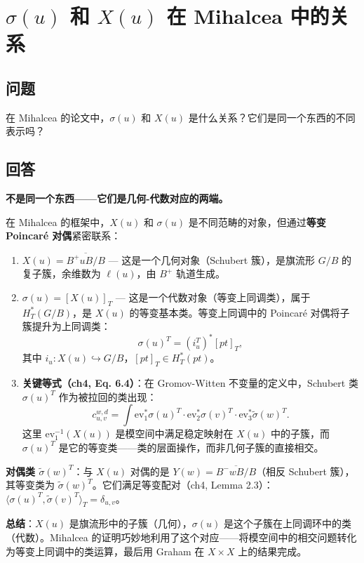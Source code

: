 \section{$\sigma(u)$ 和 $X(u)$ 在 Mihalcea 中的关系}
\subsection{问题}
在 Mihalcea 的论文中，$\sigma(u)$ 和 $X(u)$ 是什么关系？它们是同一个东西的不同表示吗？
\subsection{回答}
\textbf{不是同一个东西——它们是几何-代数对应的两端。}

在 Mihalcea 的框架中，$X(u)$ 和 $\sigma(u)$ 是不同范畴的对象，但通过\textbf{等变 Poincaré 对偶}紧密联系：

\begin{enumerate}
\item \textbf{$X(u) = \overline{B^+ u B / B}$} — 这是一个几何对象（Schubert 簇），是旗流形 $G/B$ 的复子簇，余维数为 $\ell(u)$，由 $B^+$ 轨道生成。

\item \textbf{$\sigma(u) = [X(u)]_T$} — 这是一个代数对象（等变上同调类），属于 $H_T^*(G/B)$，是 $X(u)$ 的等变基本类。等变上同调中的 Poincaré 对偶将子簇提升为上同调类：
$$\sigma(u)^T = (i_u^T)^*[pt]_T,$$
其中 $i_u: X(u) \hookrightarrow G/B$，$[pt]_T \in H_T^*(pt)$。

\item \textbf{关键等式（ch4, Eq. 6.4）}：在 Gromov-Witten 不变量的定义中，Schubert 类 $\sigma(u)^T$ 作为被拉回的类出现：
$$c_{u,v}^{w,d} = \int \mathrm{ev}_1^* \sigma(u)^T \cdot \mathrm{ev}_2^* \sigma(v)^T \cdot \mathrm{ev}_3^* \widetilde{\sigma}(w)^T.$$
这里 $\mathrm{ev}_1^{-1}(X(u))$ 是模空间中满足稳定映射在 $X(u)$ 中的子簇，而 $\sigma(u)^T$ 是它的等变类——类的层面操作，而非几何子簇的直接相交。
\end{enumerate}

\textbf{对偶类 $\widetilde{\sigma}(w)^T$}：与 $X(u)$ 对偶的是 $Y(w) = \overline{B^- w B / B}$（相反 Schubert 簇），其等变类为 $\widetilde{\sigma}(w)^T$。它们满足等变配对（ch4, Lemma 2.3）：$\langle \sigma(u)^T, \widetilde{\sigma}(v)^T \rangle_T = \delta_{u,v}$。

\textbf{总结}：$X(u)$ 是旗流形中的子簇（几何），$\sigma(u)$ 是这个子簇在上同调环中的类（代数）。Mihalcea 的证明巧妙地利用了这个对应——将模空间中的相交问题转化为等变上同调中的类运算，最后用 Graham 在 $X \times X$ 上的结果完成。

